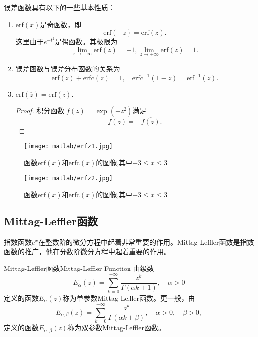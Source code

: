 \begin{property}
	误差函数具有以下的一些基本性质：
	\begin{enumerate}[noitemsep]
		\item $ \mathrm{erf} \left(x\right)$是奇函数，即
		$$ \mathrm{erf} \left(-z\right) =\mathrm{erf} \left(z\right).$$
		这里由于$\displaystyle e^{-t^2}$是偶函数。其极限为
		$$ \lim _{z \rightarrow -\infty} {\mathrm{erf} \left(z\right)} = -1, \lim _{z \rightarrow +\infty} {\mathrm{erf} \left(z\right)} = 1 .$$
		\item 误差函数与误差分布函数的关系为
		$$\mathrm{erf} \left(z\right) + \mathrm{erfc} \left(z\right) =1,\quad \mathrm{erfc}^{-1}\left(1-z\right) = \mathrm{erf}^{-1} \left(z\right).$$
		\item $\mathrm{erf} \left(\overline{z}\right) = \overline{\mathrm{erf} \left( z\right)}.$
		\begin{proof}
			积分函数 $f\left(z\right) = \exp(-z^2)$满足 $$ f(\overline{z})= -\overline{f\left(z\right)}.$$
		\end{proof}
		
	\end{enumerate}
\end{property}

\begin{figure}[ht]
	\centering
	\texttt{[image: matlab/erfz1.jpg]}
	\caption{函数$ \mathrm{erf} \left(x\right)$和$ \mathrm{erfc} \left(x\right)$的图像,其中$-3\le x \le 3$\label{fig:erfz1}}
\end{figure}

\begin{figure}[ht]
	\centering
	\texttt{[image: matlab/erfz2.jpg]}
	\caption{函数$ \mathrm{erf} \left(x\right)$和$ \mathrm{erfc} \left(x\right)$的图像,其中$-3\le x \le 3$\label{fig:erfz2}}
\end{figure}

\subsection{Mittag-Leffler函数}

指数函数$e^x$在整数阶的微分方程中起着非常重要的作用。Mittag-Leffler函数是指数函数的推广，他在分数阶微分方程中起着重要的作用。

\begin{definition}{Mittag-Leffler函数}{Mittag-Leffler Function}
	由级数
	$$E_{\alpha}\left(z\right)=\sum _{k=0}^{+\infty}{\frac{z^k}{\Gamma\left(\alpha k+1\right)}},\quad \alpha>0$$
	定义的函数$E_{\alpha}\left(z\right)$称为单参数Mittag-Leffler函数。更一般，由
	$$E_{\alpha,\beta}\left(z\right)=\sum _{k=0}^{+\infty}{\frac{z^k}{\Gamma\left(\alpha k+\beta\right)}},\quad \alpha>0,\quad \beta>0, $$
	定义的函数$E_{\alpha,\beta}\left(z\right)$称为双参数Mittag-Leffler函数。
\end{definition}

